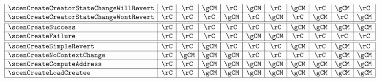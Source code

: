 \[\begin{array}{|l|c|c|c|c|c|c|c|c|c|c|}
		\scenCreateCreatorStateChangeWillRevert & \rC            & \rC            & \gCM           & \rC            & \gCM           & \rC            & \gCM           & \rC            & \gCM           & \rC            \\ \hline
		\scenCreateCreatorStateChangeWontRevert & \rC            & \rC            & \rC            & \gCM           & \rC            & \gCM           & \rC            & \gCM           & \rC            & \gCM           \\ \hline \hline
		\scenCreateSuccess                      & \rC            & \rC            & \rC            & \rC            & \rC            & \rC            & \gCM           & \gCM           & \gCM           & \gCM           \\ \hline
		\scenCreateFailure                      & \rC            & \rC            & \rC            & \rC            & \gCM           & \gCM           & \rC            & \rC            & \rC            & \rC            \\ \hline \hline
		\scenCreateSimpleRevert                 & \rC            & \rC            & \gCM           & \rC            & \rC            & \rC            & \gCM           & \rC            & \gCM           & \rC            \\ \hline
		\scenCreateNoContextChange              & \rC            & \gCM           & \gCM           & \gCM           & \rC            & \rC            & \rC            & \rC            & \gCM           & \gCM           \\ \hline
		\scenCreateComputeAddress               & \rC            & \rC            & \gCM           & \gCM           & \gCM           & \gCM           & \gCM           & \gCM           & \gCM           & \gCM           \\ \hline
		\scenCreateLoadCreatee                  & \rC            & \rC            & \gCM           & \gCM           & \gCM           & \gCM           & \gCM           & \gCM           & \gCM           & \gCM           \\ \hline
	\end{array}
\]
